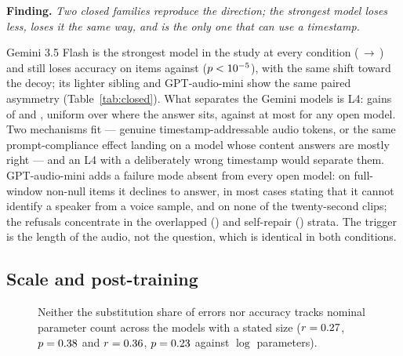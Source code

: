 \documentclass{article}
\newcommand{\finding}[1]{\par\smallskip\noindent\textbf{Finding.} \emph{#1}\par\smallskip}
\begin{document}
\finding{Two closed families reproduce the direction; the strongest model
loses less, loses it the same way, and is the only one that can use a
timestamp.}
Gemini 3.5 Flash is the strongest model in the study at every condition
(\closedgeminiflashCorrOne{}\,$\rightarrow$\,\closedgeminiflashCorrThree{})
and still loses accuracy on \closedgeminiflashPairDown{} items against
\closedgeminiflashPairUp{} ($p<10^{-5}{}$), with the same
shift toward the decoy; its lighter sibling and GPT-audio-mini show the same
paired asymmetry (Table~\ref{tab:closed}). What separates the Gemini models
is L4: gains of \closedgeminiflashOracleGain{} and
\closedgeminiliteOracleGain{}, uniform over where the answer sits, against
at most \openMaxOracleGain{} for any open model. Two mechanisms fit ---
genuine timestamp-addressable audio tokens, or the same prompt-compliance
effect landing on a model whose content answers are mostly right --- and an
L4 with a deliberately wrong timestamp would separate them. GPT-audio-mini
adds a failure mode absent from every open model: on
\closedgptaudiominiRefusals{} full-window non-null items it declines to
answer, in most cases stating that it cannot identify a speaker from a voice
sample, and on none of the twenty-second clips; the refusals concentrate in
the overlapped () and self-repair () strata. The
trigger is the length of the audio, not the question, which is identical in
both conditions.

\subsection{Scale and post-training}
\label{ssec:byscale}

\begin{figure}[t]
\centering
{}
\caption{Neither the substitution share of errors nor accuracy tracks
nominal parameter count across the \NscaleModels{} models with a stated
size ($r=0.27{}$, $p=0.38{}$ and $r=0.36{}$,
$p=0.23{}$ against $\log$ parameters).}
\label{fig:scale}
\vspace{-6pt}
\end{figure}
\end{document}
